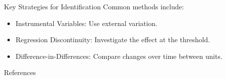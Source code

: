 \documentclass[11pt,aspectratio=169]{beamer}
\begin{document}
\begin{frame}{Key Strategies for Identification}
Common methods include:
\begin{itemize}
    \item Instrumental Variables: Use external variation.
    \item Regression Discontinuity: Investigate the effect at the threshold.
    \item Difference-in-Differences: Compare changes over time between units.
\end{itemize}

\end{frame}


\begin{frame}{References}
    \nocite{*}
    \printbibliography[heading=none]
\end{frame}
\end{document}
